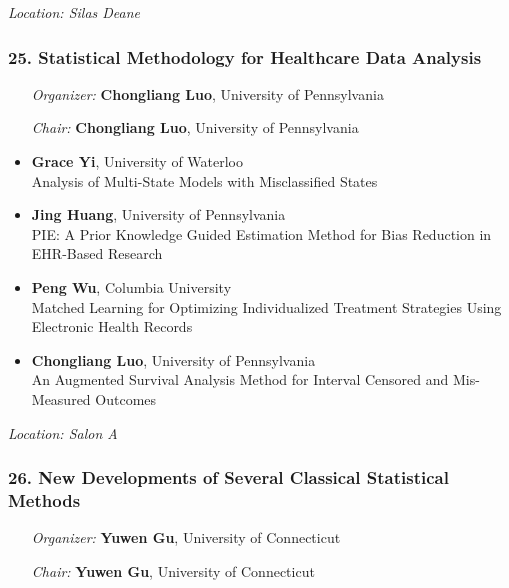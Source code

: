 \emph{Location: Silas Deane}

\subsubsection*{25. Statistical Methodology for Healthcare Data Analysis}

\begin{enumerate}[align=left]
\item [\emph{Organizer:}] \textbf{Chongliang Luo}, University of Pennsylvania
\item [\emph{Chair:}] \textbf{Chongliang Luo}, University of Pennsylvania
\end{enumerate}

\begin{itemize}
\item \textbf{Grace Yi}, University of Waterloo \\
Analysis of Multi-State Models with Misclassified States
\item \textbf{Jing Huang}, University of Pennsylvania \\
PIE: A Prior Knowledge Guided Estimation Method for Bias Reduction in EHR-Based Research
\item \textbf{Peng Wu}, Columbia University \\
Matched Learning for Optimizing Individualized Treatment Strategies Using Electronic Health Records
\item \textbf{Chongliang Luo}, University of Pennsylvania \\
An Augmented Survival Analysis Method for Interval Censored and Mis-Measured Outcomes
\end{itemize}

\emph{Location: Salon A}

\subsubsection*{26. New Developments of Several Classical Statistical Methods}

\begin{enumerate}[align=left]
\item [\emph{Organizer:}] \textbf{Yuwen Gu}, University of Connecticut
\item [\emph{Chair:}] \textbf{Yuwen Gu}, University of Connecticut
\end{enumerate}

